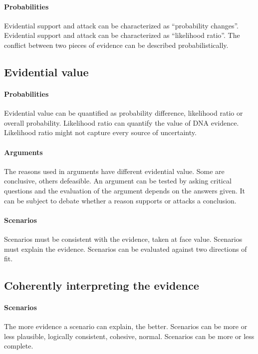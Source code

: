 \documentclass[10pt]{article}
\begin{document}
\paragraph{Probabilities}
	Evidential support and attack can be characterized as ``probability changes''.
	Evidential support and attack can be characterized as ``likelihood ratio''.
	The conflict between two pieces of evidence can be described probabilistically.

\subsection*{Evidential value}

\paragraph{Probabilities}
	Evidential value can be quantified as probability difference, likelihood ratio or overall probability.
	Likelihood ratio can quantify the value of DNA evidence.
	Likelihood ratio might not capture every source of uncertainty. 
	
\paragraph{Arguments}
	The reasons used in arguments have different evidential value. Some are conclusive, others defeasible.
	An argument can be tested by asking critical questions and the evaluation of the argument depends on the answers given.
	It can be subject to debate whether a reason supports or attacks a conclusion.
	
\paragraph{Scenarios}
	Scenarios must be consistent with the evidence, taken at face value.
	Scenarios must explain the evidence.
	Scenarios can be evaluated against two directions of fit.
	
\subsection*{Coherently interpreting the evidence}

\paragraph{Scenarios}
	The more evidence a scenario can explain, the better.
	Scenarios can be more or less plausible, logically consistent, cohesive, normal.
	Scenarios can be more or less complete.
	
\end{document}

